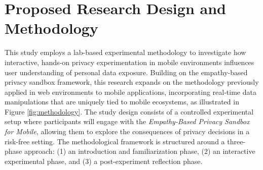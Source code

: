 \documentclass[acmlarge, nonacm]{acmart}
\begin{document}

\section{Proposed Research Design and Methodology}
This study employs a lab-based experimental methodology to investigate how interactive, hands-on privacy experimentation in mobile environments influences user understanding of personal data exposure. Building on the empathy-based privacy sandbox framework, this research expands on the methodology previously applied in web environments \cite{Chaoran2023EmpathySandbox} to mobile applications, incorporating real-time data manipulations that are uniquely tied to mobile ecosystems, as illustrated in Figure \ref{fig:methodology}. The study design consists of a controlled experimental setup where participants will engage with the \textit{Empathy-Based Privacy Sandbox for Mobile}, allowing them to explore the consequences of privacy decisions in a risk-free setting. The methodological framework is structured around a three-phase approach: (1) an introduction and familiarization phase, (2) an interactive experimental phase, and (3) a post-experiment reflection phase.
\end{document}
